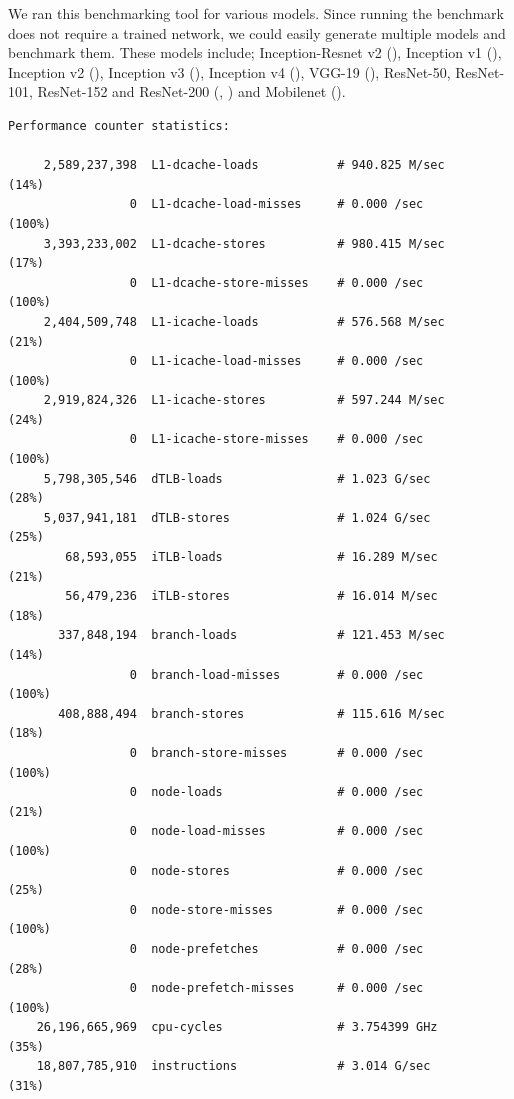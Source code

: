We ran this benchmarking tool for various models. Since running the benchmark does not require a trained network, we could easily generate multiple models and benchmark them. These models include; Inception-Resnet v2 (\cite{DBLP:journals/corr/SzegedyIV16}), Inception v1 (\cite{Szegedy:2014aa}), Inception v2 (\cite{Szegedy:2014aa}), Inception v3 (\cite{Szegedy_2016_CVPR}), Inception v4 (\cite{DBLP:journals/corr/SzegedyIV16}), VGG-19 (\cite{Simonyan:2014aa}), ResNet-50, ResNet-101, ResNet-152 and ResNet-200 (\cite{He:2015aa}, \cite{he2016identity}) and Mobilenet (\cite{howard2017mobilenets}).  


\iffalse

\begin{verbatim}
Performance counter statistics:

     2,589,237,398  L1-dcache-loads           # 940.825 M/sec       (14%)
                 0  L1-dcache-load-misses     # 0.000 /sec          (100%)
     3,393,233,002  L1-dcache-stores          # 980.415 M/sec       (17%)
                 0  L1-dcache-store-misses    # 0.000 /sec          (100%)
     2,404,509,748  L1-icache-loads           # 576.568 M/sec       (21%)
                 0  L1-icache-load-misses     # 0.000 /sec          (100%)
     2,919,824,326  L1-icache-stores          # 597.244 M/sec       (24%)
                 0  L1-icache-store-misses    # 0.000 /sec          (100%)
     5,798,305,546  dTLB-loads                # 1.023 G/sec         (28%)
     5,037,941,181  dTLB-stores               # 1.024 G/sec         (25%)
        68,593,055  iTLB-loads                # 16.289 M/sec        (21%)
        56,479,236  iTLB-stores               # 16.014 M/sec        (18%)
       337,848,194  branch-loads              # 121.453 M/sec       (14%)
                 0  branch-load-misses        # 0.000 /sec          (100%)
       408,888,494  branch-stores             # 115.616 M/sec       (18%)
                 0  branch-store-misses       # 0.000 /sec          (100%)
                 0  node-loads                # 0.000 /sec          (21%)
                 0  node-load-misses          # 0.000 /sec          (100%)
                 0  node-stores               # 0.000 /sec          (25%)
                 0  node-store-misses         # 0.000 /sec          (100%)
                 0  node-prefetches           # 0.000 /sec          (28%)
                 0  node-prefetch-misses      # 0.000 /sec          (100%)
    26,196,665,969  cpu-cycles                # 3.754399 GHz        (35%)
    18,807,785,910  instructions              # 3.014 G/sec         (31%)

\end{verbatim}
